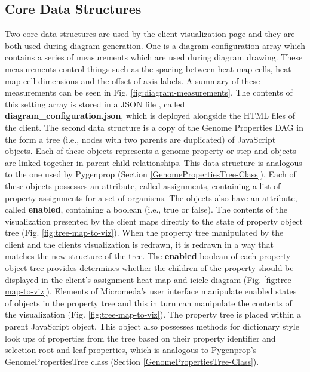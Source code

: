 \subsection{Core Data Structures} \label{visual-data-structures}

Two core data structures are used by the client visualization page and they are both used during diagram generation. One is a diagram configuration array which contains a series of measurements which are used during diagram drawing. These measurements control things such as the spacing between heat map cells, heat map cell dimensions and the offset of axis labels. A summary of these measurements can be seen in Fig. \ref{fig:diagram-measurements}. The contents of this setting array is stored in a JSON file \cite{bray2014rfc}, called \textbf{diagram\_configuration.json}, which is deployed alongside the HTML files of the client. The second data structure is a copy of the Genome Properties DAG in the form a tree (i.e., nodes with two parents are duplicated) of JavaScript objects. Each of these objects represents a genome property or step and objects are linked together in parent-child relationships. This data structure is analogous to the one used by Pygenprop (Section \ref{GenomePropertiesTree-Class}).  Each of these objects possesses an attribute, called assignments, containing a list of property assignments for a set of organisms. The objects also have an attribute, called \textbf{enabled}, containing a boolean (i.e., true or false). The contents of the visualization presented by the client  maps directly to the state of property object tree (Fig. \ref{fig:tree-map-to-viz}). When the property tree manipulated by the client and the clients visualization is redrawn, it is redrawn in a way that matches the new structure of the tree. The \textbf{enabled} boolean of each property object tree provides determines whether the children of the property should be displayed in the client's assignment heat map and icicle diagram (Fig. \ref{fig:tree-map-to-viz}). Elements of Micromeda's user interface manipulate enabled states of objects in the property tree and this in turn can manipulate the contents of the visualization (Fig. \ref{fig:tree-map-to-viz}). The property tree is placed within a parent JavaScript object. This object also possesses methods for dictionary style look ups of properties from the tree based on their property identifier and selection root and leaf properties, which is analogous to Pygenprop's GenomePropertiesTree class (Section \ref{GenomePropertiesTree-Class}).

